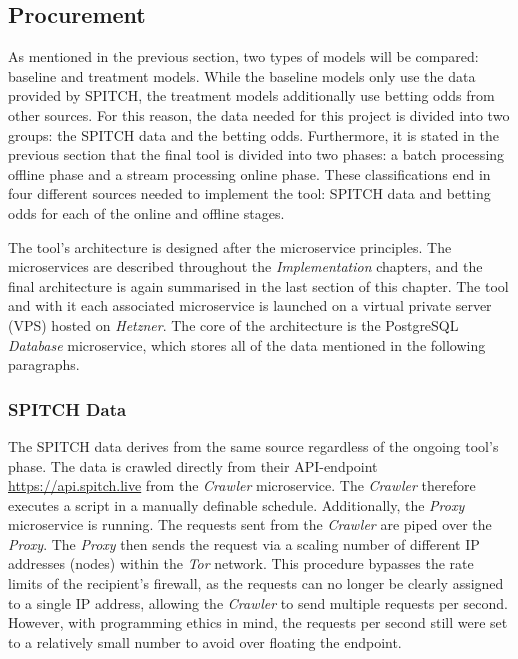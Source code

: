 \subsection{Procurement}

As mentioned in the previous section, two types of models will be compared: baseline and treatment models. While the baseline models only use the data provided by SPITCH, the treatment models additionally use betting odds from other sources. For this reason, the data needed for this project is divided into two groups: the SPITCH data and the betting odds. Furthermore, it is stated in the previous section that the final tool is divided into two phases: a batch processing offline phase and a stream processing online phase. These classifications end in four different sources needed to implement the tool: SPITCH data and betting odds for each of the online and offline stages.

The tool's architecture is designed after the microservice principles. The microservices are described throughout the \emph{Implementation} chapters, and the final architecture is again summarised in the last section of this chapter. The tool and with it each associated microservice is launched on a virtual private server (VPS) hosted on \emph{Hetzner}. \parencite[see][]{hetzner_about_2021} The core of the architecture is the PostgreSQL \emph{Database} microservice, which stores all of the data mentioned in the following paragraphs.

\subsubsection{SPITCH Data}

The SPITCH data derives from the same source regardless of the ongoing tool's phase. The data is crawled directly from their API-endpoint \underline{https://api.spitch.live} from the \emph{Crawler} microservice. The \emph{Crawler} therefore executes a script in a manually definable schedule. Additionally, the \emph{Proxy} microservice is running. The requests sent from the \emph{Crawler} are piped over the \emph{Proxy}. The \emph{Proxy} then sends the request via a scaling number of different IP addresses (nodes) within the \emph{Tor} network. This procedure bypasses the rate limits of the recipient's firewall, as the requests can no longer be clearly assigned to a single IP address, allowing the \emph{Crawler} to send multiple requests per second. However, with programming ethics in mind, the requests per second still were set to a relatively small number to avoid over floating the endpoint.

